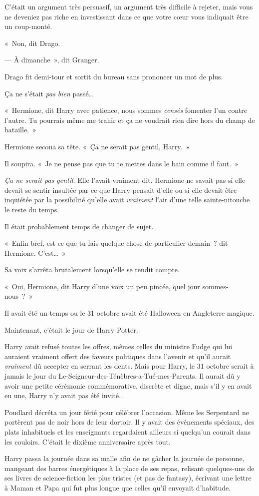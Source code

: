 C'était un argument très persuasif, un argument très difficile à rejeter, mais vous ne deveniez pas riche en investissant dans ce que votre cœur vous indiquait être un coup-monté.

«~Non, dit Drago.

--- À dimanche~», dit Granger.

Drago fit demi-tour et sortit du bureau sans prononcer un mot de plus.

Ça ne s'était \emph{pas bien} passé…

\later

«~Hermione, dit Harry avec patience, nous sommes \emph{censés} fomenter l'un contre l'autre.
Tu pourrais même me trahir et ça ne voudrait rien dire hors du champ de bataille.~»

Hermione secoua sa tête.
«~Ça ne serait pas gentil, Harry.~»

Il soupira.
«~Je ne pense pas que tu te mettes dans le bain comme il faut.~»

\emph{Ça ne serait pas gentil}.
Elle l'avait vraiment dit.
Hermione ne savait pas si elle devait se sentir insultée par ce que Harry pensait d'elle ou si elle devait être inquiétée par la possibilité qu'elle avait \emph{vraiment} l'air d'une telle sainte-nitouche le reste du temps.

Il était probablement temps de changer de sujet.

«~Enfin bref, est-ce que tu fais quelque chose de particulier demain~? dit Hermione.
C'est…~»

Sa voix s'arrêta brutalement lorsqu'elle se rendit compte.

«~Oui, Hermione, dit Harry d'une voix un peu pincée, quel jour sommes-nous~?~»


Il avait été un temps ou le 31 octobre avait été Halloween en Angleterre magique.

Maintenant, c'était le jour de Harry Potter.

Harry avait refusé toutes les offres, mêmes celles du ministre Fudge qui lui auraient vraiment offert des faveurs politiques dans l'avenir et qu'il aurait \emph{vraiment} dû accepter en serrant les dents.
Mais pour Harry, le 31 octobre serait à jamais le jour du Le-Seigneur-des-Ténèbres-a-Tué-mes-Parents.
Il aurait dû y avoir une petite cérémonie commémorative, discrète et digne, mais s'il y en avait eu une, Harry n'y avait pas été invité.

Poudlard décréta un jour férié pour célébrer l'occasion.
Même les Serpentard ne portèrent pas de noir hors de leur dortoir.
Il y avait des événements spéciaux, des plats inhabituels et les enseignants regardaient ailleurs si quelqu'un courait dans les couloirs.
C'était le dixième anniversaire après tout.

Harry passa la journée dans sa malle afin de ne gâcher la journée de personne, mangeant des barres énergétiques à la place de ses repas, relisant quelques-uns de ses livres de science-fiction les plus tristes (et pas de fantasy), écrivant une lettre à Maman et Papa qui fut plus longue que celles qu'il envoyait d'habitude.


